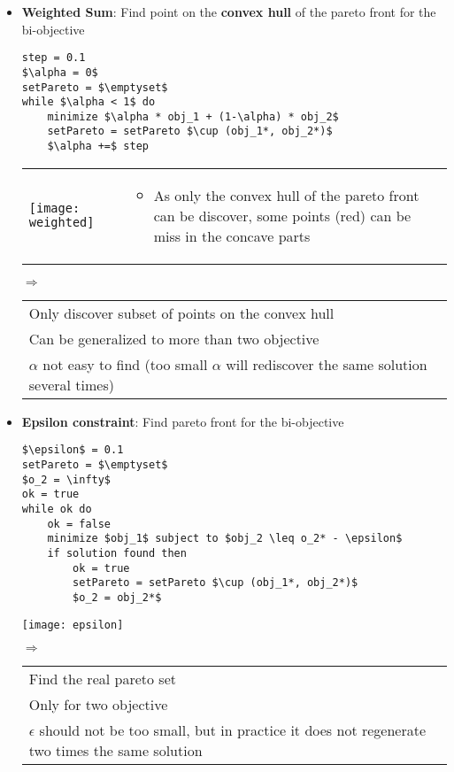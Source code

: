 \begin{itemize}
    \item \textbf{Weighted Sum}:  Find point on the \textbf{convex hull}
        of the pareto front for the bi-objective 

        \begin{lstlisting}[mathescape]
step = 0.1
$\alpha = 0$
setPareto = $\emptyset$
while $\alpha < 1$ do
    minimize $\alpha * obj_1 + (1-\alpha) * obj_2$
    setPareto = setPareto $\cup (obj_1*, obj_2*)$
    $\alpha +=$ step
    \end{lstlisting}

    \begin{tabular}{m{10cm}m{6cm}}
        \texttt{[image: weighted]}
        &
        \begin{itemize}
            \item As only the convex hull of the pareto front can be
                discover, some points (red) can be miss in the concave parts
        \end{itemize}
    \end{tabular}

    $\Rightarrow$ \begin{tabular}{l}
        Only discover subset of points on the convex hull\\
        Can be generalized to more than two objective\\
        $\alpha$ not easy to find (too small $\alpha$ will rediscover
        the same solution several times)
        \end{tabular}

    \item \textbf{Epsilon constraint}: Find pareto front for the
        bi-objective

        \begin{lstlisting}[mathescape]
$\epsilon$ = 0.1
setPareto = $\emptyset$
$o_2 = \infty$
ok = true
while ok do
    ok = false
    minimize $obj_1$ subject to $obj_2 \leq o_2* - \epsilon$
    if solution found then
        ok = true
        setPareto = setPareto $\cup (obj_1*, obj_2*)$
        $o_2 = obj_2*$
    \end{lstlisting}

    \begin{center}
        \texttt{[image: epsilon]}
    \end{center}

    $\Rightarrow$ \begin{tabular}{l}
        Find the real pareto set\\
        Only for two objective\\
        $\epsilon$ should not be too small, but in practice it does not
        regenerate two times the same solution
    \end{tabular}

\end{itemize}

